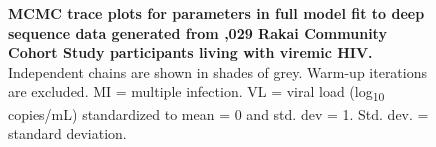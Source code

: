 \documentclass[10pt,letterpaper]{article}
\begin{document}
\begin{figure}[!ht]
\caption{{\bf MCMC trace plots for parameters in full model fit to deep sequence data generated from ,029 Rakai Community Cohort Study participants living with viremic HIV.} Independent chains are shown in shades of grey. Warm-up iterations are excluded. MI = multiple infection. VL = viral load (log\textsubscript{10} copies/mL) standardized to mean = 0 and std. dev = 1. Std. dev. = standard deviation. }
\end{figure}
\end{document}
